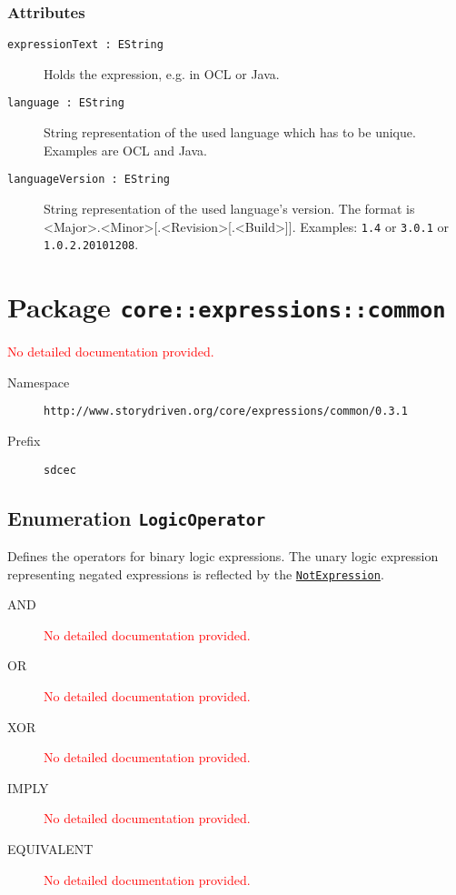 \subsubsection*{Attributes}
\begin{description}
\item[\texttt{expressionText~:~EString}] Holds the expression, e.g. in OCL or Java.
\item[\texttt{language~:~EString}] String representation of the used language which has to be unique. Examples are OCL and Java.
\item[\texttt{languageVersion~:~EString}] String representation of the used language's version. The format is <Major>.<Minor>[.<Revision>[.<Build>]]. Examples: \texttt{1.4} or \texttt{3.0.1} or \texttt{1.0.2.20101208}.
\end{description}
\section{Package \texttt{core::expressions::common}}
\label{api:core.ecore::expressions:common}
\textcolor{red}{No detailed documentation provided.}
\begin{description}
\item[Namespace] \texttt{http://www.storydriven.org/core/expressions/common/0.3.1}
\item[Prefix] \texttt{sdcec}
\end{description}
\subsection{Enumeration \texttt{LogicOperator}}
Defines the operators for binary logic expressions. The unary logic expression representing negated expressions is reflected by the \hyperref[NotExpression]{\texttt{NotExpression}}.
\begin{description}
\item[AND] \textcolor{red}{No detailed documentation provided.}
\item[OR] \textcolor{red}{No detailed documentation provided.}
\item[XOR] \textcolor{red}{No detailed documentation provided.}
\item[IMPLY] \textcolor{red}{No detailed documentation provided.}
\item[EQUIVALENT] \textcolor{red}{No detailed documentation provided.}
\end{description}

